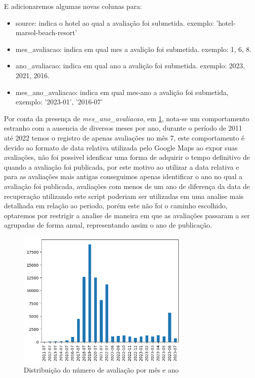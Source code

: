 E adicionaremos algumas novas colunas para:

\begin{itemize}
	\item source: indica o hotel ao qual a avaliação foi submetida. exemplo: 'hotel-marsol-beach-resort'
	\item mes\_avaliacao: indica em qual mes a avalição foi submetida. exemplo: 1, 6, 8.
	\item ano\_avaliacao: indica em qual ano a avalição foi submetida. exemplo: 2023, 2021, 2016.
	\item mes\_ano\_avaliacao: indica em qual mes-ano a avalição foi submetida, exemplo: '2023-01', '2016-07'
\end{itemize}

Por conta da presença de \emph{mes\_ano\_avaliacao}, em \ref{img:dist_ano_mes_avaliacao}, nota-se um comportamento estranho com a ausencia de diversos meses por ano, durante o período de 2011 até 2022 temos o registro de apenas avaliações no mês 7, este comportamento é devido ao formato de data relativa utilizada pelo Google Maps ao expor suas avaliações, não foi possivel idenficar uma forma de adquirir o tempo definitivo de quando a avaliação foi publicada, por este motivo ao utilizar a data relativa e para as avaliações mais antigas conseguimos apenas identificar o ano no qual a avaliação foi publicada, avaliações com menos de um ano de diferença da data de recuperação utilizando este script poderiam ser utilizadas em uma analise mais detalhada em relação ao periodo, porém este não foi o caminho escolhido, optaremos por restrigir a analise de maneira em que as avaliações passaram a ser agrupadas de forma anual, representando assim o ano de publicação.

\begin{figure}
	\centering
	\includegraphics[width=0.75\textwidth]{figs/exploratoria/distribuicao_ano_mes_avaliacao.png}
	\caption{Distribuição do número de avaliação por mês e ano}
	\label{img:dist_ano_mes_avaliacao}
\end{figure}


